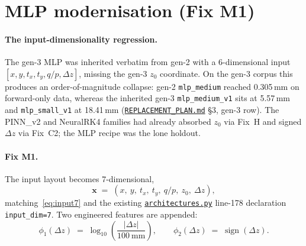 \documentclass[11pt,a4paper]{article}
\newcommand{\qop}{q/p}
\newcommand{\dz}{\Delta z}
\begin{document}
\section{MLP modernisation (Fix M1)}\label{sec:M1}

\paragraph{The input-dimensionality regression.} The gen-3 MLP was inherited
verbatim from gen-2 with a 6-dimensional input
$[x, y, t_x, t_y, \qop, \dz]$, missing the gen-3 $z_0$ coordinate. On the
gen-3 corpus this produces an order-of-magnitude collapse: gen-2
\texttt{mlp\_medium} reached 0.305\,mm on forward-only data, whereas the
inherited gen-3 \texttt{mlp\_medium\_v1} sits at 5.57\,mm and
\texttt{mlp\_small\_v1} at 18.41\,mm
(\href{run:../../experiments/gen_3/REPLACEMENT_PLAN.md}{\texttt{REPLACEMENT\_PLAN.md}}
§3, gen-3 row). The PINN\_v2 and NeuralRK4 families had already absorbed
$z_0$ via Fix~H and signed $\dz$ via Fix~C2; the MLP recipe was the lone
holdout.

\paragraph{Fix M1.} The input layout becomes 7-dimensional,
\begin{equation}\label{eq:input7-mlp}
\mathbf{x} \;=\; (x,\ y,\ t_x,\ t_y,\ \qop,\ z_0,\ \dz),
\end{equation}
matching~\eqref{eq:input7} and the existing
\href{run:../../experiments/gen_3/models/architectures.py}{\texttt{architectures.py}}
line-178 declaration \texttt{input\_dim=7}. Two engineered features are
appended:
\begin{equation}\label{eq:eng}
\phi_1(\dz) \;=\; \log_{10}\!\left(\frac{|\dz|}{100\ \mathrm{mm}}\right),
\qquad
\phi_2(\dz) \;=\; \operatorname{sign}(\dz).
\end{equation}
\end{document}
